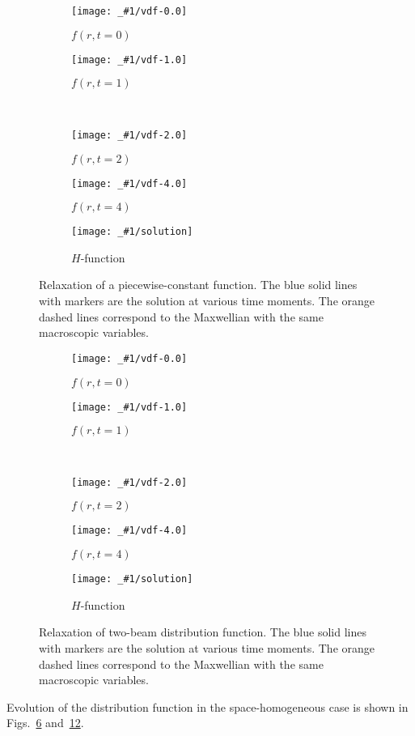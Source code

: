 \documentclass{article}
\begin{document}
\newcommand{\addfigure}[2]{
\begin{figure}
    \centering
    \begin{subfigure}[b]{0.5\textwidth}
        \texttt{[image: \_\#1/vdf-0.0]}
        \caption{$f(r,t=0)$}
        \label{fig:#1:0}
    \end{subfigure}%
    \begin{subfigure}[b]{0.5\textwidth}
        \texttt{[image: \_\#1/vdf-1.0]}
        \caption{$f(r,t=1)$}
        \label{fig:#1:1}
    \end{subfigure}\\
    \begin{subfigure}[b]{0.5\textwidth}
        \texttt{[image: \_\#1/vdf-2.0]}
        \caption{$f(r,t=2)$}
        \label{fig:#1:2}
    \end{subfigure}%
    \begin{subfigure}[b]{0.5\textwidth}
        \texttt{[image: \_\#1/vdf-4.0]}
        \caption{$f(r,t=4)$}
        \label{fig:#1:4}
    \end{subfigure}
    \begin{subfigure}[b]{0.75\textwidth}
        \texttt{[image: \_\#1/solution]}
        \caption{$H$-function}
        \label{fig:#1:H}
    \end{subfigure}
    \caption{
        Relaxation of #2.
        The blue solid lines with markers are the solution at various time moments.
        The orange dashed lines correspond to the Maxwellian with the same macroscopic variables.
    }\label{fig:#1}
\end{figure}
}
\addfigure{piecewise}{a piecewise-constant function}
\addfigure{piecewise_hole}{two-beam distribution function}

Evolution of the distribution function in the space-homogeneous case is shown in
Figs.~\ref{fig:piecewise} and~\ref{fig:piecewise_hole}.

\printbibliography
\end{document}
